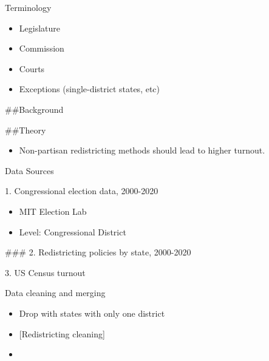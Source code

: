 \documentclass[
  ignorenonframetext,
]{beamer}
\providecommand{\tightlist}{%
  \setlength{\itemsep}{0pt}\setlength{\parskip}{0pt}}
\begin{document}
\begin{frame}{Terminology}
\protect\hypertarget{terminology}{}
\begin{itemize}
\tightlist
\item
  Legislature
\item
  Commission
\item
  Courts
\item
  Exceptions (single-district states, etc)
\end{itemize}

\#\#Background

\#\#Theory

\begin{itemize}
\tightlist
\item
  Non-partisan redistricting methods should lead to higher turnout.
\end{itemize}
\end{frame}

\begin{frame}{Data Sources}
\protect\hypertarget{data-sources}{}
\begin{block}{1. Congressional election data, 2000-2020}
\protect\hypertarget{congressional-election-data-2000-2020}{}
\begin{itemize}
\tightlist
\item
  MIT Election Lab
\item
  Level: Congressional District
\end{itemize}
\end{block}
\end{frame}

\begin{frame}{\#\#\# 2. Redistricting policies by state, 2000-2020}
\protect\hypertarget{redistricting-policies-by-state-2000-2020}{}
\begin{block}{3. US Census turnout}
\protect\hypertarget{us-census-turnout}{}
\end{block}
\end{frame}

\begin{frame}{Data cleaning and merging}
\protect\hypertarget{data-cleaning-and-merging}{}
\begin{itemize}
\item
  Drop with states with only one district
\item
  {[}Redistricting cleaning{]}
\item
\end{itemize}
\end{frame}
\end{document}
